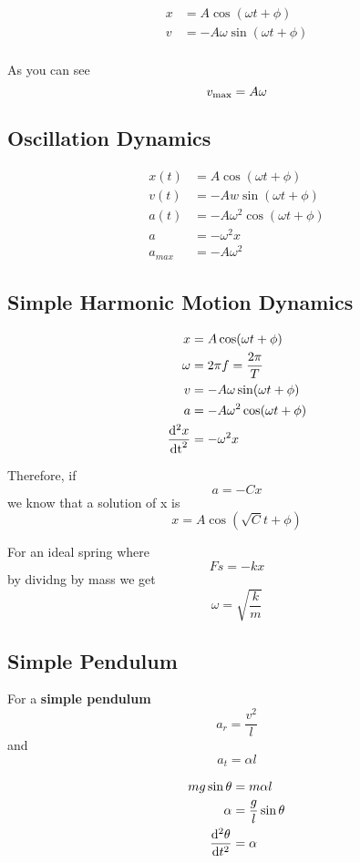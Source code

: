 \documentclass[12pt]{article}
\begin{document}
\begin{align*}
x &= A\cos(\omega t + \phi)\\
v &= -A\omega\sin(\omega t + \phi)\\
\end{align*}

As you can see \[ v_{{\rm max}} = A\omega \]

\subsection*{Oscillation Dynamics}
\begin{align*}
x(t) &= A\cos(\omega t+\phi)\\
v(t) &= -Aw\sin(\omega t+\phi)\\
a(t) &= -A\omega^2\cos(\omega t+\phi)\\
a &= -\omega^2x\\
a_{max} &= -A\omega^2
\end{align*}

\subsection*{Simple Harmonic Motion Dynamics}
\begin{align*}
x &= A\cos(\omega t + \phi)\\
\omega &= 2\pi f = \frac{2\pi}{T}\\
v &= -A\omega\sin(\omega t + \phi)\\
a &= -A\omega^2\cos(\omega t + \phi)\\
\frac{{\rm d}^2x}{{\rm dt}^2} &= -\omega^2x
\end{align*}

Therefore, if \[ a = -Cx \] we know that a solution of x is \[ x = A\cos(\sqrt{C}t + \phi) \]

For an ideal spring where \[ Fs = -kx \] by dividng by mass we get \[ \omega = \sqrt{\frac{k}{m}} \]

\subsection*{Simple Pendulum}
For a {\bf simple pendulum} \[ a_r = \frac{v^2}{l} \] and \[ a_t = \alpha l \]

\begin{align*}
mg\sin\theta &= m\alpha l\\
\alpha &= \frac{g}{l}\sin\theta\\
\frac{{\rm d}^2\theta}{{\rm d}t^2} &= \alpha
\end{align*}
\end{document}
